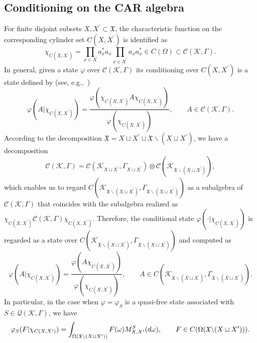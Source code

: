\documentclass[11pt]{article}
\numberwithin{equation}{section}
\numberwithin{equation}{section}
\newcommand{\pr}[1]{#1^{\prime}}
\newcommand{\mfrak}[1]{\mathfrak{#1}}
\newcommand{\mcal}[1]{\mathcal{#1}}
\begin{document}
\subsection{Conditioning on the CAR algebra}\label{subsect:conditioning_CAR_alg}
For finite disjoint subsets $X, \pr{X}\subset\mfrak{X}$, the characteristic function on the corresponding cylinder set $C(X,\pr{X})$ is identified as
\begin{equation*}
	\chi_{C(X,\pr{X})}=\prod_{x\in X}a_{x}^{\ast}a_{x} \prod_{x\in \pr{X}} a_{x}a_{x}^{\ast}\in C(\Omega)\subset \mcal{C}(\mcal{K},\Gamma).
\end{equation*}
In general, given a state $\varphi$ over $\mcal{C}(\mcal{K},\Gamma)$ its conditioning over $C(X,\pr{X})$ is a state defined by (see, e.g.,~\cite{RedeiSummers2006})
\begin{equation*}
	\varphi (A|\chi_{C(X,\pr{X})})=\frac{\varphi (\chi_{C(X,\pr{X})}A\chi_{C(X,\pr{X})})}{\varphi (\chi_{C(X,\pr{X})})},\qquad A\in \mcal{C}(\mcal{K},\Gamma).
\end{equation*}
According to the decomposition $\mfrak{X}=X\sqcup \pr{X}\sqcup \mfrak{X}\backslash (X\sqcup\pr{X})$, we have a decomposition
\begin{equation*}
	\mcal{C}(\mcal{K},\Gamma)=\mcal{C}(\mcal{K}_{X\sqcup \pr{X}},\Gamma_{X\sqcup\pr{X}})\otimes \mcal{C}(\mcal{K}_{\mfrak{X}\backslash (X\sqcup\pr{X})}),
\end{equation*}
which enables us to regard $C(\mcal{K}_{\mfrak{X}\backslash (X\sqcup\pr{X})},\Gamma_{\mfrak{X}\backslash (X\sqcup\pr{X})})$ as a subalgebra of $\mcal{C}(\mcal{K},\Gamma)$ that coincides with the subalgebra realized as $\chi_{C(X,\pr{X})}\mcal{C}(\mcal{K},\Gamma)\chi_{C(X,\pr{X})}$.
Therefore, the conditional state $\varphi (\cdot|\chi_{C(X,\pr{X})})$ is regarded as a state over $C(\mcal{K}_{\mfrak{X}\backslash (X\sqcup\pr{X})},\Gamma_{\mfrak{X}\backslash (X\sqcup\pr{X})})$ and computed as
\begin{equation*}
	\varphi (A|\chi_{C(X,\pr{X})})=\frac{\varphi (A\chi_{C(X,\pr{X})})}{\varphi (\chi_{C(X,\pr{X})})},\qquad A\in C(\mcal{K}_{\mfrak{X}\backslash (X\sqcup\pr{X})},\Gamma_{\mfrak{X}\backslash (X\sqcup\pr{X})}).
\end{equation*}
In particular, in the case when $\varphi=\varphi_{S}$ is a quasi-free state associated with $S\in \mcal{Q}(\mcal{K},\Gamma)$, we have
\begin{equation*}
	\varphi_{S}(F|\chi_{C(X,\pr{X})})=\int_{\Omega (\mfrak{X}\backslash (X\sqcup\pr{X}))}F(\omega)M^{S}_{X,\pr{X}}({\rm d}\omega),\qquad F\in C(\Omega (\mfrak{X}\backslash (X\sqcup\pr{X}))).
\end{equation*}
\end{document}
